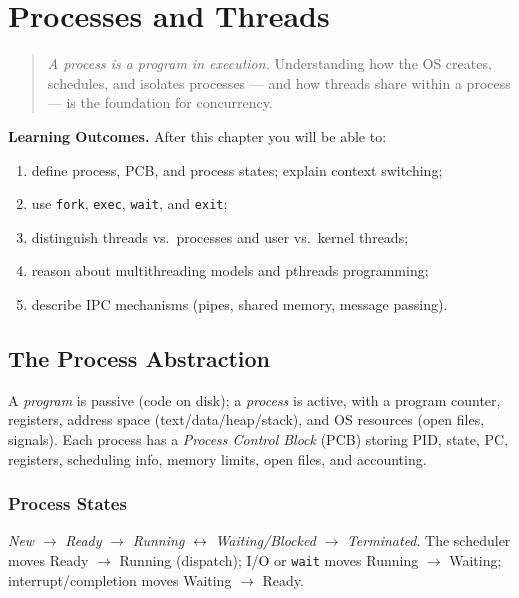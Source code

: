 \chapter{Processes and Threads}
\label{ch:processes}

\begin{quote}
\emph{A process is a program in execution.} Understanding how the OS creates,
schedules, and isolates processes --- and how threads share within a process ---
is the foundation for concurrency.
\end{quote}

\noindent\textbf{Learning Outcomes.} After this chapter you will be able to:
\begin{enumerate}[label=(L\arabic*)]
  \item define process, PCB, and process states; explain context switching;
  \item use \texttt{fork}, \texttt{exec}, \texttt{wait}, and \texttt{exit};
  \item distinguish threads vs.\ processes and user vs.\ kernel threads;
  \item reason about multithreading models and pthreads programming;
  \item describe IPC mechanisms (pipes, shared memory, message passing).
\end{enumerate}

\section{The Process Abstraction}
\label{sec:process-def}

A \emph{program} is passive (code on disk); a \emph{process} is active, with a
program counter, registers, address space (text/data/heap/stack), and OS
resources (open files, signals). Each process has a \emph{Process Control Block}
(PCB) storing PID, state, PC, registers, scheduling info, memory limits, open
files, and accounting.

\subsection{Process States}
\begin{center}
\textit{New} $\to$ \textit{Ready} $\to$ \textit{Running} $\leftrightarrow$
\textit{Waiting/Blocked} $\to$ \textit{Terminated}. The scheduler moves Ready
$\to$ Running (dispatch); I/O or \texttt{wait} moves Running $\to$ Waiting;
interrupt/completion moves Waiting $\to$ Ready.
\end{center}

